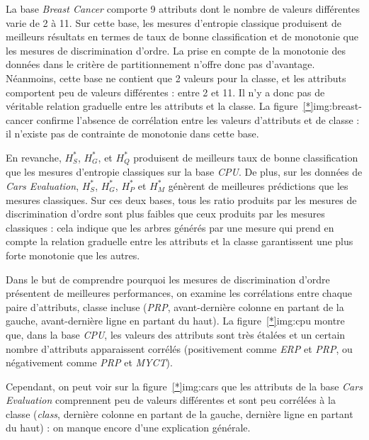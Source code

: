 \documentclass[a4paper]{article}
\newcommand{\figref}[1]{figure~\ref{#1}}
\begin{document}
La base \emph{Breast Cancer} comporte 9 attributs dont le nombre de valeurs
différentes varie de 2 à 11. Sur cette base, les mesures d'entropie classique
produisent de meilleurs résultats en termes de taux de bonne classification et
de monotonie que les mesures de discrimination d'ordre. La prise en compte de la
monotonie des données dans le critère de partitionnement n'offre donc pas
d'avantage. Néanmoins, cette base ne contient que 2 valeurs pour la classe, et
les attributs comportent peu de valeurs différentes : entre 2 et 11. Il n'y a
donc pas de véritable relation graduelle entre les attributs et la classe. La
\figref*{img:breast-cancer} confirme l'absence de corrélation entre les valeurs
d'attributs et de classe : il n'existe pas de contrainte de monotonie dans cette
base.

En revanche, $H^*_S$, $H^*_G$, et $H^*_Q$ produisent de meilleurs taux de bonne
classification que les mesures d'entropie classiques sur la base \emph{CPU}.
De plus, sur les données de \emph{Cars Evaluation}, $H^*_S$, $H^*_G$, $H^*_P$
et $H^*_M$ génèrent de meilleures prédictions que les mesures classiques. Sur
ces deux bases, tous les ratio produits par les mesures de discrimination
d'ordre sont plus faibles que ceux produits par les mesures classiques : cela
indique que les arbres générés par une mesure qui prend en compte la relation
graduelle entre les attributs et la classe garantissent une plus forte monotonie
que les autres.

Dans le but de comprendre pourquoi les mesures de discrimination d'ordre
présentent de meilleures performances, on examine les corrélations entre chaque
paire d'attributs, classe incluse (\emph{PRP}, avant-dernière colonne en partant de la
gauche, avant-dernière ligne en partant du haut). La \figref*{img:cpu} montre que, dans la base
\emph{CPU}, les valeurs des attributs sont très étalées et un certain nombre
d'attributs apparaissent corrélés (positivement comme \emph{ERP} et \emph{PRP}, ou
négativement comme \emph{PRP} et \emph{MYCT}).

Cependant, on peut voir sur la \figref*{img:cars} que les attributs de la base
\emph{Cars Evaluation} comprennent peu de valeurs différentes et sont peu
corrélées à la classe (\emph{class}, dernière colonne en partant de la gauche,
dernière ligne en partant du haut) : on manque encore d'une explication générale. \\
\end{document}
